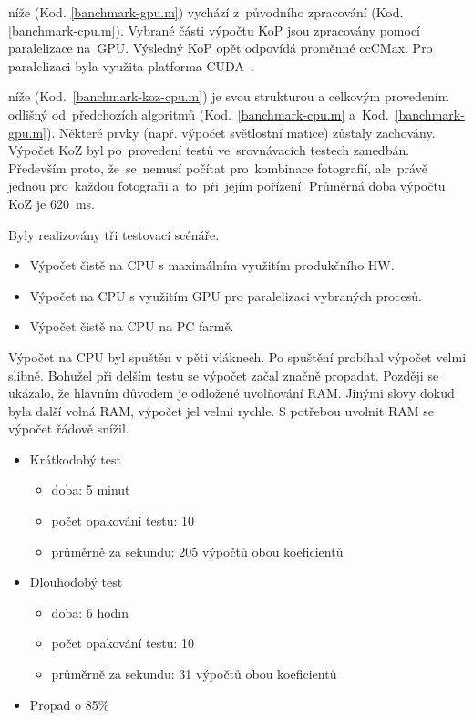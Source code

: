 níže (Kod. \ref{banchmark-gpu.m}) vychází z~původního zpracování (Kod. \ref{banchmark-cpu.m}). Vybrané části výpočtu KoP jsou zpracovány pomocí paralelizace na~GPU. Výsledný KoP opět odpovídá proměnné ccCMax. Pro paralelizaci byla využita platforma CUDA~\cite{cuda}.

níže (Kod.~\ref{banchmark-koz-cpu.m}) je svou strukturou a celkovým provedením odlišný od~předchozích algoritmů (Kod.~\ref{banchmark-cpu.m} a~Kod.~\ref{banchmark-gpu.m}). Některé prvky (např. výpočet světlostní matice) zůstaly zachovány. Výpočet KoZ byl po~provedení testů ve~srovnávacích testech zanedbán. Především proto, že~se~nemusí počítat pro~kombinace fotografií, ale~právě jednou pro~každou fotografii a~to~při~jejím pořízení. Průměrná doba výpočtu KoZ je 620~ms.

Byly realizovány tři testovací scénáře.
\begin{itemize}
	\setlength{\parskip}{0pt}
	\setlength{\itemsep}{0pt}
	\item {Výpočet čistě na CPU s maximálním využitím produkčního HW.}
	\item {Výpočet na CPU s využitím GPU pro paralelizaci vybraných procesů.}
	\item {Výpočet čistě na CPU na PC farmě.}
\end{itemize}

Výpočet na CPU byl spuštěn v pěti vláknech. Po spuštění probíhal výpočet velmi slibně. Bohužel při delším testu se výpočet začal značně propadat. Později se ukázalo, že hlavním důvodem je odložené uvolňování RAM. Jinými slovy dokud byla další volná RAM, výpočet jel velmi rychle. S potřebou uvolnit RAM se výpočet řádově snížil.
\begin{itemize}
	\setlength{\parskip}{0pt}
	\setlength{\itemsep}{0pt}
	\item {Krátkodobý test}
		\begin{itemize}
			\setlength{\parskip}{0pt}
			\setlength{\itemsep}{0pt}
			\item {doba: 5 minut}
			\item {počet opakování testu: 10}
			\item {průměrně za sekundu: 205 výpočtů obou koeficientů}
		\end{itemize}
	\item {Dlouhodobý test}
		\begin{itemize}
			\setlength{\parskip}{0pt}
			\setlength{\itemsep}{0pt}
			\item {doba: 6 hodin}
			\item {počet opakování testu: 10}
			\item {průměrně za sekundu: 31 výpočtů obou koeficientů}
		\end{itemize}
	\item {Propad o 85\%}
\end{itemize}

